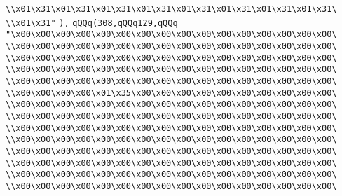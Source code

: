 \verb|\\x01\x31\x01\x31\x01\x31\x01\x31\x01\x31\x01\x31\x01\x31\x01\x31\|\newline
\verb|\\x01\x31"|\newline
\verb|),|\newline
\verb|qQQq(308,qQQq129,qQQq|\newline
\verb|"\x00\x00\x00\x00\x00\x00\x00\x00\x00\x00\x00\x00\x00\x00\x00\x00\|\newline
\verb|\\x00\x00\x00\x00\x00\x00\x00\x00\x00\x00\x00\x00\x00\x00\x00\x00\|\newline
\verb|\\x00\x00\x00\x00\x00\x00\x00\x00\x00\x00\x00\x00\x00\x00\x00\x00\|\newline
\verb|\\x00\x00\x00\x00\x00\x00\x00\x00\x00\x00\x00\x00\x00\x00\x00\x00\|\newline
\verb|\\x00\x00\x00\x00\x00\x00\x00\x00\x00\x00\x00\x00\x00\x00\x00\x00\|\newline
\verb|\\x00\x00\x00\x00\x01\x35\x00\x00\x00\x00\x00\x00\x00\x00\x00\x00\|\newline
\verb|\\x00\x00\x00\x00\x00\x00\x00\x00\x00\x00\x00\x00\x00\x00\x00\x00\|\newline
\verb|\\x00\x00\x00\x00\x00\x00\x00\x00\x00\x00\x00\x00\x00\x00\x00\x00\|\newline
\verb|\\x00\x00\x00\x00\x00\x00\x00\x00\x00\x00\x00\x00\x00\x00\x00\x00\|\newline
\verb|\\x00\x00\x00\x00\x00\x00\x00\x00\x00\x00\x00\x00\x00\x00\x00\x00\|\newline
\verb|\\x00\x00\x00\x00\x00\x00\x00\x00\x00\x00\x00\x00\x00\x00\x00\x00\|\newline
\verb|\\x00\x00\x00\x00\x00\x00\x00\x00\x00\x00\x00\x00\x00\x00\x00\x00\|\newline
\verb|\\x00\x00\x00\x00\x00\x00\x00\x00\x00\x00\x00\x00\x00\x00\x00\x00\|\newline
\verb|\\x00\x00\x00\x00\x00\x00\x00\x00\x00\x00\x00\x00\x00\x00\x00\x00\|\newline
